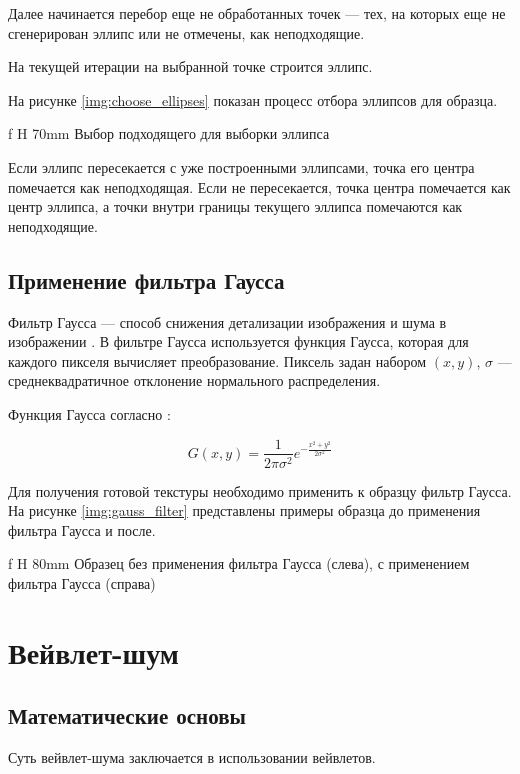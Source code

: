 Далее начинается перебор еще не обработанных точек --- тех, на которых еще не сгенерирован эллипс или не отмечены, как неподходящие.

На текущей итерации на выбранной точке строится эллипс.

На рисунке \ref{img:choose_ellipses} показан процесс отбора эллипсов для образца.

 {f} {H} {70mm}%
{Выбор подходящего для выборки эллипса}

Если эллипс пересекается с уже построенными эллипсами, точка его центра помечается как неподходящая. Если не пересекается, точка центра помечается как центр эллипса, а точки внутри границы текущего эллипса помечаются как неподходящие.

\subsection{Применение фильтра Гаусса}

Фильтр Гаусса --- способ снижения детализации изображения и шума в изображении \cite{mitskikh2018}.
В фильтре Гаусса используется функция Гаусса, которая для каждого пикселя вычисляет преобразование.
Пиксель задан набором $(x,y)$, $\sigma$ --- среднеквадратичное отклонение нормального распределения.

Функция Гаусса согласно \cite{haddad1991class}:

\begin{equation}\label{eq:gauss_fn}
	G(x,y)=\frac{1}{2\pi\sigma^2}e^{-\frac{x^2+y^2}{2\sigma^2}}
\end{equation}

Для получения готовой текстуры необходимо применить к образцу фильтр Гаусса.
На рисунке \ref{img:gauss_filter} представлены примеры образца до применения фильтра Гаусса и после.

 {f} {H} {80mm}%
{Образец без применения фильтра Гаусса (слева), с применением фильтра Гаусса (справа)}

\section{Вейвлет-шум}

\subsection{Математические основы}

Суть вейвлет-шума заключается в использовании вейвлетов.

